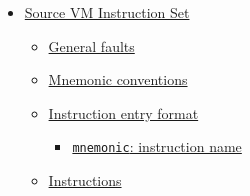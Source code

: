 \begin{itemize}
\item \hyperref[sec:orgdf5f0e0]{Source VM Instruction Set}

\begin{itemize}
\item \hyperref[sec:orgd013882]{General faults}
\item \hyperref[sec:org6c2c333]{Mnemonic conventions}
\item \hyperref[sec:org6af44d0]{Instruction entry format}

\begin{itemize}
\item \hyperref[sec:org91c15ea]{\texttt{mnemonic}: instruction name}
\end{itemize}

\item \hyperref[sec:org33d7595]{Instructions}


\end{itemize}
\end{itemize}
